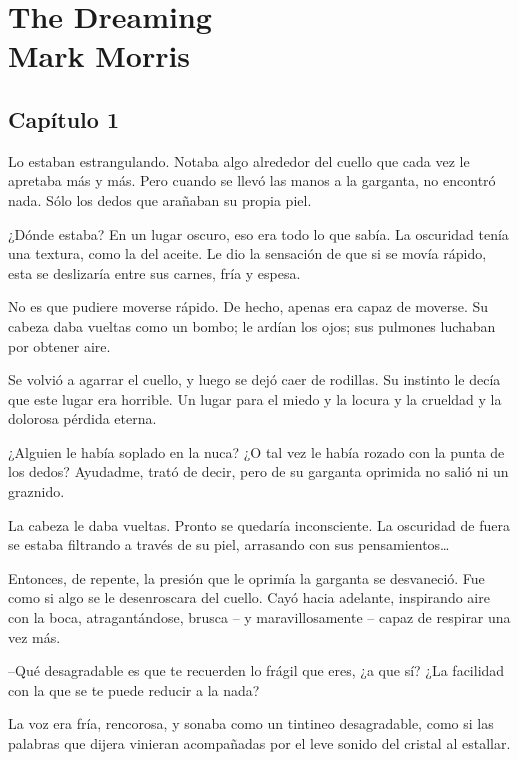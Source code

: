 \part*{The Dreaming \\ \vspace{2 mm} {\large Mark Morris}}

\chapter*{Capítulo 1}

Lo estaban estrangulando. Notaba algo alrededor del cuello que cada vez le apretaba más y más. Pero cuando se llevó las manos a la garganta, no encontró nada. Sólo los dedos que arañaban su propia piel.

¿Dónde estaba? En un lugar oscuro, eso era todo lo que sabía. La oscuridad tenía una textura, como la del aceite. Le dio la sensación de que si se movía rápido, esta se deslizaría entre sus carnes, fría y espesa.

No es que pudiere moverse rápido. De hecho, apenas era capaz de moverse. Su cabeza daba vueltas como un bombo; le ardían los ojos; sus pulmones luchaban por obtener aire.

Se volvió a agarrar el cuello, y luego se dejó caer de rodillas. Su instinto le decía que este lugar era horrible. Un lugar para el miedo y la locura y la crueldad y la dolorosa pérdida eterna.

¿Alguien le había soplado en la nuca? ¿O tal vez le había rozado con la punta de los dedos? Ayudadme, trató de decir, pero de su garganta oprimida no salió ni un graznido.

La cabeza le daba vueltas. Pronto se quedaría inconsciente. La oscuridad de fuera se estaba filtrando a través de su piel, arrasando con sus pensamientos…

Entonces, de repente, la presión que le oprimía la garganta se desvaneció. Fue como si algo se le desenroscara del cuello. Cayó hacia adelante, inspirando aire con la boca, atragantándose, brusca – y maravillosamente – capaz de respirar una vez más.

--Qué desagradable es que te recuerden lo frágil que eres, ¿a que sí? ¿La facilidad con la que se te puede reducir a la nada?

La voz era fría, rencorosa, y sonaba como un tintineo desagradable, como si las palabras que dijera vinieran acompañadas por el leve sonido del cristal al estallar.

